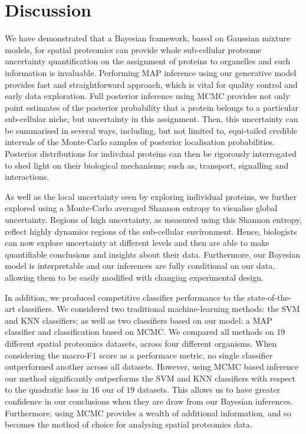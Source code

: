 \documentclass[12pt,english]{article}\usepackage[]{graphicx}\usepackage[]{color}
\begin{document}
\clearpage
\section{Discussion}

We have demonstrated that a Bayesian framework, based on Gaussian
mixture models, for spatial proteomics can provide whole sub-cellular
proteome uncertainty quantification on the assignment of proteins to
organelles and such information is invaluable. Performing MAP
inference using our generative model provides fast and straightforward
approach, which is vital for quality control and early data
exploration. Full posterior inference using MCMC provides not only
point estimates of the posterior probability that a protein belongs to
a particular sub-cellular niche, but uncertainty in this
assignment. Then, this uncertainty can be summarised in several ways,
including, but not limited to, equi-tailed credible intervals of the
Monte-Carlo samples of posterior localisation probabilities.
Posterior distributions for indivdual proteins can then be rigorously
interrogated to shed light on their biological mechanisms; such as,
transport, signalling and interactions.

As well as the local uncertainty seen by exploring individual
proteins, we further explored using a Monte-Carlo averaged Shannon
entropy to visualise global uncertainty. Regions of high uncertainty,
as measured using this Shannon entropy, reflect highly dynamics
regions of the sub-cellular environment.  Hence, biologists can now
explore uncertainty at different levels and then are able to make
quantifiable conclusions and insights about their data.  Furthermore,
our Bayesian model is interpretable and our inferences are fully
conditional on our data, allowing them to be easily modified with
changing experimental design.

In addition, we produced competitive classifier performance to the
state-of-the-art classifiers. We considered two traditional
machine-learning methods: the SVM and KNN classifiers; as well as two
classifiers based on our model: a MAP classifier and classification
based on MCMC. We compared all methods on 19 different spatial
proteomics datasets, across four different organisms. When considering
the macro-F1 score as a performace metric, no single classifier
outperformed another across all datasets. However, using MCMC based
inference our method significantly outperforms the SVM and KNN
classifiers with respect to the quadratic loss in $16$ our of $19$
datasets. This allows us to have greater confidence in our conclusions
when they are draw from our Bayesian inferences. Furthermore, using
MCMC provides a wealth of additional information, and so becomes the
mothod of choice for analysing spatial proteomics data.
\end{document}
